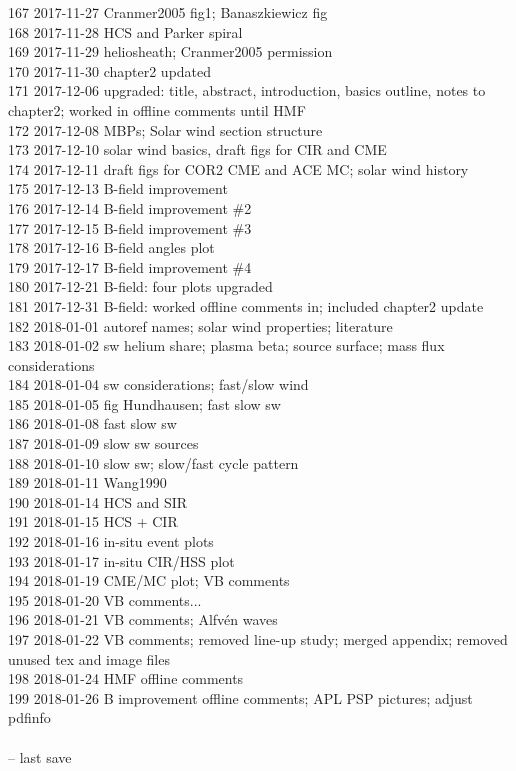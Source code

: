 \begin{footnotesize}
167	2017-11-27	Cranmer2005 fig1; Banaszkiewicz fig\\
168	2017-11-28	HCS and Parker spiral\\
169	2017-11-29	heliosheath; Cranmer2005 permission\\
170	2017-11-30	chapter2 updated\\
171	2017-12-06	upgraded: title, abstract, introduction, basics outline, notes to chapter2; worked in offline comments until HMF\\
172	2017-12-08	MBPs; Solar wind section structure\\
173	2017-12-10	solar wind basics, draft figs for CIR and CME\\
174	2017-12-11	draft figs for COR2 CME and ACE MC; solar wind history\\
175	2017-12-13	B-field improvement\\
176	2017-12-14	B-field improvement \#2\\
177	2017-12-15	B-field improvement \#3\\
178	2017-12-16	B-field angles plot\\
179	2017-12-17	B-field improvement \#4\\
180	2017-12-21	B-field: four plots upgraded\\
181	2017-12-31	B-field: worked offline comments in; included chapter2 update\\
182	2018-01-01	autoref names; solar wind properties; literature\\
183	2018-01-02	sw helium share; plasma beta; source surface; mass flux considerations\\
184	2018-01-04	sw considerations; fast/slow wind\\
185	2018-01-05	fig Hundhausen; fast slow sw\\
186	2018-01-08	fast slow sw\\
187	2018-01-09	slow sw sources\\
188	2018-01-10	slow sw; slow/fast cycle pattern\\
189	2018-01-11	Wang1990\\
190	2018-01-14	HCS and SIR\\
191	2018-01-15	HCS + CIR\\
192	2018-01-16	in-situ event plots\\
193	2018-01-17	in-situ CIR/HSS plot\\
194	2018-01-19	CME/MC plot; VB comments\\
195	2018-01-20	VB comments...\\
196	2018-01-21	VB comments; Alfvén waves\\
197	2018-01-22	VB comments; removed line-up study; merged appendix; removed unused tex and image files\\
198	2018-01-24	HMF offline comments\\
199	2018-01-26	B improvement offline comments; APL PSP pictures; adjust pdfinfo\\
\\
\ISOToday{} \thistime{} -- last save
\end{footnotesize}

